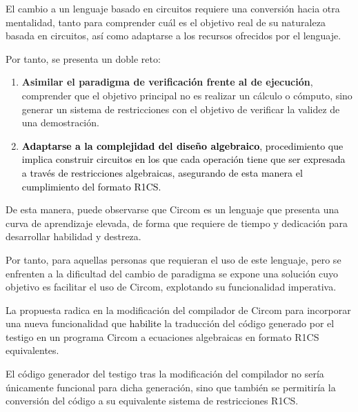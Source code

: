 \documentclass[a4paper,12pt]{report}
\begin{document}
	\vspace{0.2cm}
	\noindent El cambio a un lenguaje basado en circuitos requiere una conversión hacia otra mentalidad, tanto para comprender cuál es el objetivo real de su naturaleza basada en circuitos, así como adaptarse a los recursos ofrecidos por el lenguaje.
	
	\vspace{0.2cm}
	\noindent Por tanto, se presenta un doble reto:
	
	\begin{enumerate}
		\item \textbf{Asimilar el paradigma de verificación frente al de ejecución}, comprender que el objetivo principal no es realizar un cálculo o cómputo, sino generar un sistema de restricciones con el objetivo de verificar la validez de una demostración.
		\item  \textcolor{black}{\textbf{Adaptarse a la complejidad del diseño algebraico}, procedimiento que implica construir circuitos en los que cada operación tiene que ser expresada a través de restricciones algebraicas, asegurando de esta manera el cumplimiento del formato R1CS.}
	\end{enumerate}
	
	
	\vspace{0.2cm}
	\noindent De esta manera, puede observarse que Circom es un lenguaje que presenta una curva de aprendizaje elevada, de forma que requiere de tiempo y dedicación para desarrollar habilidad y destreza. 
	
	\vspace{0.2cm}
	\noindent Por tanto, para aquellas personas que requieran el uso de este lenguaje, pero se enfrenten a la dificultad del cambio de paradigma se expone una solución cuyo objetivo es facilitar el uso de Circom, explotando su funcionalidad imperativa.
	
	\vspace{0.2cm}
	\noindent La propuesta radica en la modificación del compilador de Circom para incorporar una nueva funcionalidad que \textcolor{black}{habilite} la traducción del código generado por el testigo en un programa Circom a ecuaciones algebraicas en formato R1CS equivalentes.
	
	\vspace{0.2cm}
	\noindent El código generador del testigo tras la modificación del compilador no sería únicamente funcional para dicha generación, sino que también se permitiría la conversión del código a su equivalente sistema de restricciones R1CS.
	
\end{document}
